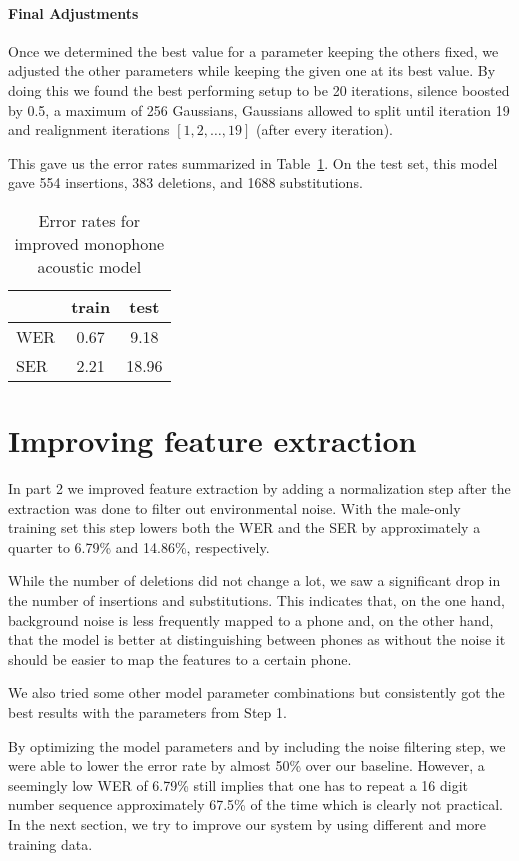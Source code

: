 \documentclass[twocolumn, 11pt]{article}
\begin{document}
\paragraph{Final Adjustments}
Once we determined the best value for a parameter keeping the others fixed, we
adjusted the other parameters while keeping the given one at its best value.
By doing this we found the best performing setup to be  20 iterations, silence boosted by 0.5, a maximum of 256 Gaussians, Gaussians allowed to split until iteration 19 and realignment iterations $[1, 2, \ldots, 19]$ (after every iteration).

This gave us the error rates summarized in Table~\ref{tab:wer-mono}. On the test
set, this model gave 554 insertions, 383 deletions, and 1688 substitutions.

\begin{table}[h]\centering
  \begin{tabular}{lcc}
    \toprule
    & train & test \\
    \midrule
    WER & 0.67 & 9.18 \\
    SER & 2.21 & 18.96 \\
    \bottomrule
  \end{tabular}
  \caption{Error rates for improved monophone acoustic
  model}\label{tab:wer-mono}
\end{table}

\section{Improving feature extraction}

In part 2 we improved feature extraction by adding a normalization step after
the extraction was done to filter out environmental noise. With the male-only
training set this step lowers both the WER and the SER by approximately a
quarter to 6.79\% and 14.86\%, respectively.

While the number of deletions did not change a lot, we saw a significant drop
in the number of insertions and substitutions. This indicates that, on the one
hand, background noise is less frequently mapped to a phone and, on the other
hand, that the model is better at distinguishing between phones as without the
noise it should be easier to map the features to a certain phone.

We also tried some other model parameter combinations but consistently got the
best results with the parameters from Step 1.

By optimizing the model parameters and by including the noise filtering step,
we were able to lower the error rate by almost 50\% over our baseline. However,
a seemingly low WER of 6.79\% still implies that one has to repeat a 16 digit
number sequence approximately 67.5\% of the time which is clearly not
practical. In the next section, we try to improve our system by using
different and more training data.
\end{document}
